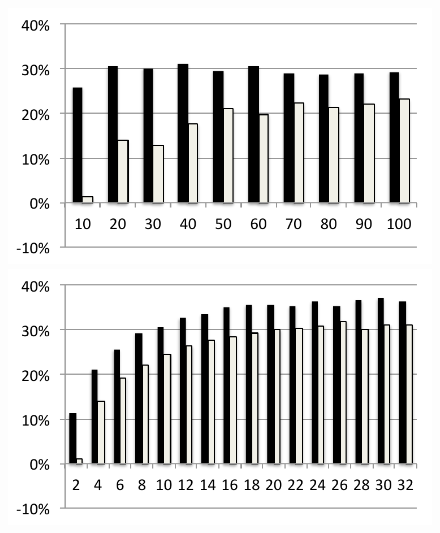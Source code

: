 \begin{figure}
  \medskip
  \includegraphics[width=\mywidth]{../../eval/32threads/case2it.pdf}\includegraphics[width=\mywidth]{../../eval/32threads/case2th.pdf}


\end{figure}
